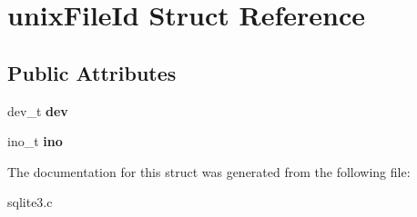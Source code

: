 \hypertarget{structunixFileId}{}\section{unix\+File\+Id Struct Reference}
\label{structunixFileId}
\subsection*{Public Attributes}
\begin{DoxyCompactItemize}
\item 
dev\+\_\+t {\bfseries dev}\hypertarget{structunixFileId_acf703d95b9a1ae2f34affb7e9ae45e1b}{}\label{structunixFileId_acf703d95b9a1ae2f34affb7e9ae45e1b}

\item 
ino\+\_\+t {\bfseries ino}\hypertarget{structunixFileId_a2cc2d43e9d3f0a60810daa8fc353e692}{}\label{structunixFileId_a2cc2d43e9d3f0a60810daa8fc353e692}

\end{DoxyCompactItemize}


The documentation for this struct was generated from the following file\+:\begin{DoxyCompactItemize}
\item 
sqlite3.\+c\end{DoxyCompactItemize}
